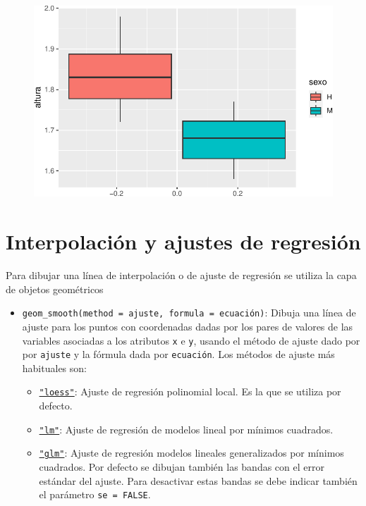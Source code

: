 \documentclass[
  a4paper,
]{scrreport}
\providecommand{\tightlist}{%
  \setlength{\itemsep}{0pt}\setlength{\parskip}{0pt}}\usepackage{longtable,booktabs,array}
\theoremstyle{definition}
\theoremstyle{definition}
\theoremstyle{remark}
\begin{document}
\begin{figure}[H]

{\centering \includegraphics{./07-graficos_files/figure-pdf/unnamed-chunk-22-1.pdf}

}

\end{figure}

\hypertarget{interpolaciuxf3n-y-ajustes-de-regresiuxf3n}{%
\section{Interpolación y ajustes de
regresión}\label{interpolaciuxf3n-y-ajustes-de-regresiuxf3n}}

Para dibujar una línea de interpolación o de ajuste de regresión se
utiliza la capa de objetos geométricos

\begin{itemize}
\tightlist
\item
  \texttt{geom\_smooth(method\ =\ ajuste,\ formula\ =\ ecuación)}:
  Dibuja una línea de ajuste para los puntos con coordenadas dadas por
  los pares de valores de las variables asociadas a los atributos
  \texttt{x} e \texttt{y}, usando el método de ajuste dado por por
  \texttt{ajuste} y la fórmula dada por \texttt{ecuación}. Los métodos
  de ajuste más habituales son:

  \begin{itemize}
  \tightlist
  \item
    \href{https://rdrr.io/r/stats/loess.html}{\texttt{"loess"}}: Ajuste
    de regresión polinomial local. Es la que se utiliza por defecto.
  \item
    \href{https://rdrr.io/r/stats/lm.html}{\texttt{"lm"}}: Ajuste de
    regresión de modelos lineal por mínimos cuadrados.
  \item
    \href{https://rdrr.io/r/stats/glm.html}{\texttt{"glm"}}: Ajuste de
    regresión modelos lineales generalizados por mínimos cuadrados. Por
    defecto se dibujan también las bandas con el error estándar del
    ajuste. Para desactivar estas bandas se debe indicar también el
    parámetro \texttt{se\ =\ FALSE}.
  \end{itemize}
\end{itemize}
\end{document}
